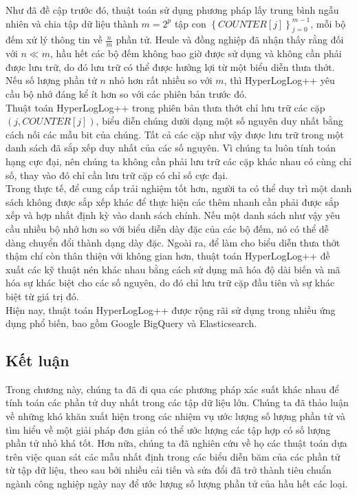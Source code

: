 \documentclass[letterpaper,13pt]{article}
\theoremstyle{mytheor}
\begin{document}
Như đã đề cập trước đó, thuật toán sử dụng phương pháp lấy trung bình ngẫu nhiên và chia tập dữ liệu thành $m = 2^p$ tập con $\left\{COUNTER[j]\right\}_{j=0}^{m-1}$, 
mỗi bộ đếm xử lý thông tin về $\frac{n}{m}$ phần tử. Heule và đồng nghiệp đã nhận thấy rằng đối với $n \ll m$, hầu hết các bộ đếm không bao giờ được 
sử dụng và không cần phải được lưu trữ, do đó lưu trữ có thể được hưởng lợi từ một biểu diễn thưa thớt. Nếu số lượng phần tử $n$ nhỏ hơn rất nhiều 
so với $m$, thì HyperLogLog++ yêu cầu bộ nhớ đáng kể ít hơn so với các phiên bản trước đó.\\
\indent Thuật toán HyperLogLog++ trong phiên bản thưa thớt chỉ lưu trữ các cặp $(j, COUNTER[j])$, biểu diễn chúng dưới dạng một số nguyên duy nhất 
bằng cách nối các mẫu bit của chúng. Tất cả các cặp như vậy được lưu trữ trong một danh sách đã sắp xếp duy nhất của các số nguyên. 
Vì chúng ta luôn tính toán hạng cực đại, nên chúng ta không cần phải lưu trữ các cặp khác nhau có cùng chỉ số, thay vào đó chỉ cần lưu trữ cặp 
có chỉ số cực đại.\\

Trong thực tế, để cung cấp trải nghiệm tốt hơn, người ta có thể duy trì một danh sách không được sắp xếp khác để thực hiện các thêm nhanh 
cần phải được sắp xếp và hợp nhất định kỳ vào danh sách chính. Nếu một danh sách như vậy yêu cầu nhiều bộ nhớ hơn so với biểu diễn dày đặc 
của các bộ đếm, nó có thể dễ dàng chuyển đổi thành dạng dày đặc. Ngoài ra, để làm cho biểu diễn thưa thớt thậm chí còn thân thiện với không gian hơn, 
thuật toán HyperLogLog++ đề xuất các kỹ thuật nén khác nhau bằng cách sử dụng mã hóa độ dài biến và mã hóa sự khác biệt cho các số nguyên, 
do đó chỉ lưu trữ cặp đầu tiên và sự khác biệt từ giá trị đó.\\

\indent Hiện nay, thuật toán HyperLogLog++ được rộng rãi sử dụng trong nhiều ứng dụng phổ biến, bao gồm Google BigQuery và Elasticsearch.
\subsection*{Kết luận}
Trong chương này, chúng ta đã đi qua các phương pháp xác suất khác nhau để tính toán các phần tử duy nhất trong các tập dữ liệu lớn. 
Chúng ta đã thảo luận về những khó khăn xuất hiện trong các nhiệm vụ ước lượng số lượng phần tử và tìm hiểu về một giải pháp đơn giản có thể ước lượng 
các tập hợp có số lượng phần tử nhỏ khá tốt. Hơn nữa, chúng ta đã nghiên cứu về họ các thuật toán dựa trên việc quan sát các mẫu nhất định trong 
các biểu diễn băm của các phần tử từ tập dữ liệu, theo sau bởi nhiều cải tiến và sửa đổi đã trở thành tiêu chuẩn ngành công nghiệp ngày nay để 
ước lượng số lượng phần tử của hầu hết các loại.\\
\newpage
\end{document}
